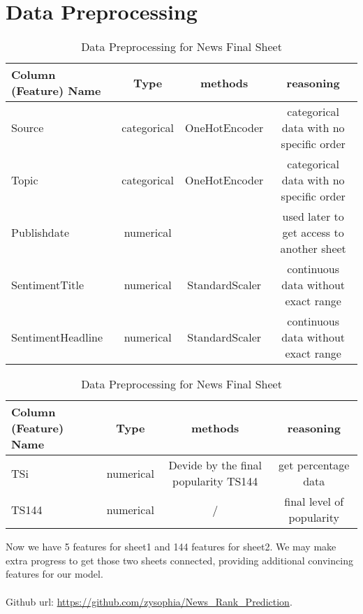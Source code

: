 \documentclass[10pt]{article}
\begin{document}
\section{Data Preprocessing}

\begin{table}[h!]
    \begin{center}
      \caption{Data Preprocessing for News Final Sheet}
      \label{tab:table3}
      \begin{tabular}{l|c|c|c} 
        \textbf{Column (Feature) Name} & \textbf{Type} & \textbf{methods} & \textbf{reasoning}\\
        \hline
        Source & categorical & OneHotEncoder & categorical data with no specific order\\
        Topic & categorical & OneHotEncoder & categorical data with no specific order\\
        Publishdate & numerical &  & used later to get access to another sheet \\
        SentimentTitle & numerical & StandardScaler & continuous data without exact range\\
        SentimentHeadline & numerical & StandardScaler & continuous data without exact range\\
      \end{tabular}
    \end{center}
\end{table}


  \begin{table}[h!]
    \begin{center}
      \caption{Data Preprocessing for News Final Sheet}
      \label{tab:table3}
      \begin{tabular}{l|c|c|c} 
        \textbf{Column (Feature) Name} & \textbf{Type} & \textbf{methods} & \textbf{reasoning}\\
        \hline
        TSi & numerical & Devide by the final popularity TS144 & get percentage data\\
        
        TS144 & numerical & / & final level of popularity\\
      
      \end{tabular}
    \end{center}
\end{table}

Now we have 5 features for sheet1 and 144 features for sheet2. We may make extra progress to get 
those two sheets connected, providing additional convincing features for our model.
\\\\
Github url: 
\href{https://github.com/zysophia/News_Rank_Prediction}{https://github.com/zysophia/News\_Rank\_Prediction}.
\end{document}
